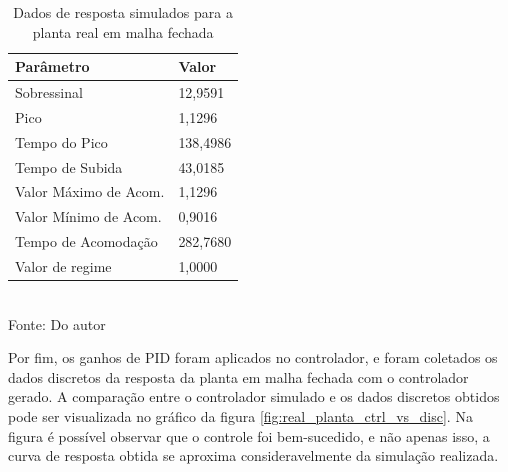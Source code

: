 \begin{table}[H]
    \caption{Dados de resposta simulados para a planta real em malha fechada}
    \centering
    \begin{tabular}{|l|l|}
        \hline
        \textbf{Parâmetro}    & \textbf{Valor} \\ \hline
        Sobressinal           & 12,9591        \\ \hline
        Pico                  & 1,1296         \\ \hline
        Tempo do Pico         & 138,4986       \\ \hline
        Tempo de Subida       & 43,0185        \\ \hline
        Valor Máximo de Acom. & 1,1296         \\ \hline
        Valor Mínimo de Acom. & 0,9016         \\ \hline
        Tempo de Acomodação   & 282,7680       \\ \hline
        Valor de regime       & 1,0000         \\ \hline
    \end{tabular}
    \label{tab:real_planta_response_data}
    \\
    \vspace{0cm}\hspace{0cm}\small{Fonte: Do autor}
\end{table}

Por fim, os ganhos de PID foram aplicados no controlador, e foram coletados os dados discretos da resposta da planta
em malha fechada com o controlador gerado.
A comparação entre o controlador simulado e os dados discretos obtidos pode ser visualizada no gráfico da figura
\ref{fig:real_planta_ctrl_vs_disc}.
Na figura é possível observar que o controle foi bem-sucedido, e não apenas isso, a curva de resposta obtida se
aproxima consideravelmente da simulação realizada.

